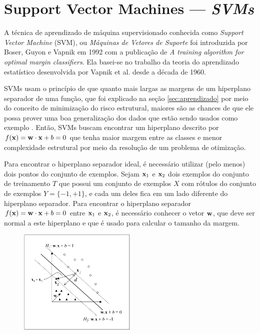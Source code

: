 
\section{Support Vector Machines --- \it{SVMs}}\label{sec:svm}
%

A técnica de aprendizado de máquina supervisionado conhecida como \emph{Support Vector Machine} (SVM), ou \emph{Máquinas de Vetores de Suporte} foi introduzida por Boser, Guyon e Vapnik em 1992 com a publica\c{c}ão de \emph{A training algorithm for optimal margin classifiers}\nocite{boser1992training}. Ela basei-se no trabalho da teoria do aprendizado estatístico desenvolvida por Vapnik et al. desde a década de 1960.

SVMs usam o princípio de que quanto mais largas as margens de um hiperplano separador de uma fun\c{c}ão, que foi explicado na se\c{c}ão \ref{sec:aprendizado} por meio do conceito de minimiza\c{c}ão do risco estrutural, maiores são as chances de que ele possa prover uma boa generaliza\c{c}ão dos dados que estão sendo usados como exemplo \cite{chapelle2002choosing}. Então, SVMs buscam encontrar um hiperplano descrito por $f(\mathbf{x}) = \mathbf{w}\cdot\mathbf{x} + b = 0$ que tenha maior margem entre as classes e menor complexidade estrutural por meio da resolu\c{c}ão de um problema de otimiza\c{c}ão.

Para encontrar o hiperplano separador ideal, é necessário utilizar (pelo menos) dois pontos do conjunto de exemplos. Sejam $\mathbf{x}_1$ e $\mathbf{x}_2$ dois exemplos do conjunto de treinamento $T$ que possui um conjunto de exemplos $X$ com rótulos do conjunto de exemplos $Y = \{-1, +1\}$, e cada um deles fica em um lado diferente do hiperplano separador. Para encontrar o hiperplano separador $f(\mathbf{x}) = \mathbf{w}\cdot\mathbf{x} + b = 0$ entre $\mathbf{x}_1$ e $\mathbf{x}_2$, é necessário conhecer o vetor $\mathbf{w}$, que deve ser normal a este hiperplano e que é usado para calcular o tamanho da margem.

\begin{figure}[h!]
  \centering
  \includegraphics[width=0.5\textwidth]{img/fig-hiperplanos.png}
  \label{fig:hiperplanos}
\end{figure}

